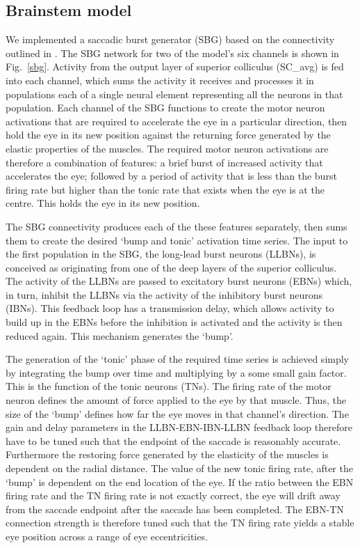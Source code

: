 \subsection{Brainstem model}

We implemented a saccadic burst generator (SBG) based
on the connectivity outlined in \cite{gancarz_neural_1998}. The SBG network
for two of the model's
six channels is shown in Fig.~\ref{sbg}. Activity from the output
layer of superior colliculus (SC\_avg) is fed into each channel, which
sums the activity it receives and processes it in populations each of
a single neural element representing all the neurons in that
population. Each channel of the SBG functions to create the motor neuron
activations that are required to accelerate the eye in a particular
direction, then hold the eye in its new position against the returning
force generated by the elastic properties of the muscles.  The
required motor neuron activations are therefore a combination of features:
a brief burst of
increased activity that accelerates the eye; followed by a period
of activity that is less than the burst firing rate but higher than
the tonic rate that exists when the eye is at the centre. This
holds the eye in its new position.

The SBG connectivity produces each of the these features separately,
then sums them to create the desired `bump and tonic' activation
time series.  The input to the first population in the SBG, the
long-lead burst neurons (LLBNs), is conceived as originating from
one of the deep layers of the superior colliculus.  The activity
of the LLBNs are passed to excitatory burst neurons (EBNs) which,
in turn, inhibit the LLBNs via the activity of the inhibitory
burst neurons (IBNs).  This feedback loop has a transmission delay,
which allows activity to build up in the EBNs before the inhibition
is activated and the activity is then reduced again.  This mechanism
generates the `bump'.

The generation of the `tonic' phase of the required time series is
achieved simply by integrating the bump over time and multiplying by a
some small gain factor.  This is the function of the tonic neurons (TNs).
The firing rate of the motor neuron defines the amount of force applied
to the eye by that muscle.  Thus, the size of the `bump' defines how far
the eye moves in that channel's direction.  The gain and delay parameters
in the LLBN-EBN-IBN-LLBN feedback loop therefore have to be tuned such that
the endpoint of the saccade is reasonably accurate.  Furthermore the
restoring force generated by the elasticity of the muscles is dependent
on the radial distance.  The value of the new tonic firing rate, after
the `bump' is dependent on the end location of the eye.  If the ratio
between the EBN firing rate and the TN firing rate is not exactly
correct, the eye will drift away from the saccade endpoint after the
saccade has been completed.  The EBN-TN connection strength is
therefore tuned such that the TN firing rate yields a stable eye
position across a range of eye eccentricities.

